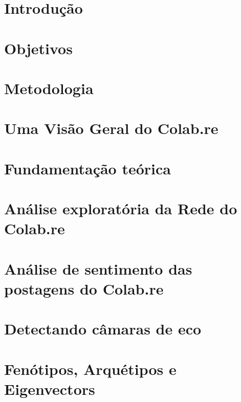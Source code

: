 \documentclass[mestrado, pre-defesa]{packages/icmc}
\begin{document}
\textual

\chapter{Introdução}
\label{chapter:01_introducao}


\chapter{Objetivos}
\label{chapter:02_objetivos}


\chapter{Metodologia}
\label{chapter:03_metodologia}


\chapter{Uma Visão Geral do Colab.re}
\label{chapter:04_colab}


\chapter{Fundamentação teórica}
\label{chapter:05_networkanalysis}


\chapter{Análise exploratória da Rede do Colab.re}
\label{chapter:06_exploratory}


\chapter{Análise de sentimento das postagens do Colab.re}
\label{chapter:07_sentiment}


\chapter{Detectando câmaras de eco}
\label{chapter:08_echochamberdetection}


\chapter{Fenótipos, Arquétipos e Eigenvectors}
\label{chapter:09_results}

\end{document}

